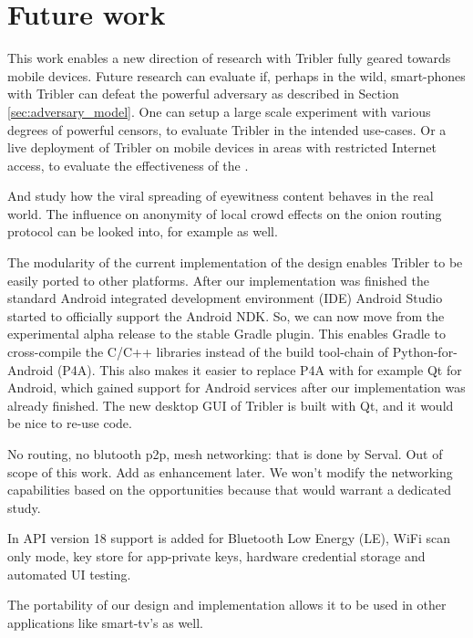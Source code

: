 \section{Future work}\label{sec:future_work}
This work enables a new direction of research with Tribler fully geared towards mobile devices.
Future research can evaluate if, perhaps in the wild, smart-phones with Tribler can defeat the powerful adversary as described in Section \ref{sec:adversary_model}.
One can setup a large scale experiment with various degrees of powerful censors, to evaluate Tribler in the intended use-cases.
Or a live deployment of Tribler on mobile devices in areas with restricted Internet access, to evaluate the effectiveness of the .

And study how the viral spreading of eyewitness content behaves in the real world.
The influence on anonymity of local crowd effects on the onion routing protocol can be looked into, for example as well.

The modularity of the current implementation of the design enables Tribler to be easily ported to other platforms.
After our implementation was finished the standard Android integrated development environment (IDE) Android Studio started to officially support the Android NDK.
So, we can now move from the experimental alpha release to the stable Gradle plugin.
This enables Gradle to cross-compile the C/C++ libraries instead of the build tool-chain of Python-for-Android (P4A).
This also makes it easier to replace P4A with for example Qt for Android, which gained support for Android services after our implementation was already finished.
The new desktop GUI of Tribler is built with Qt, and it would be nice to re-use code.





No routing, no blutooth p2p, mesh networking: that is done by Serval. Out of scope of this work. Add as enhancement later.
We won't modify the networking capabilities based on the opportunities because that would warrant a dedicated study.


In API version 18 support is added for Bluetooth Low Energy (LE), WiFi scan only mode, key store for app-private keys, hardware credential storage and automated UI testing.


The portability of our design and implementation allows it to be used in other applications like smart-tv's as well.



